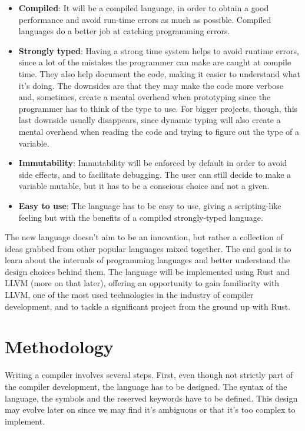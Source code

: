 ﻿\documentclass[10pt,a4paper,twocolumn,twoside]{article}
\begin{document}
\begin{itemize}
     \item \textbf{Compiled}: It will be a compiled language, in order to obtain
         a good performance and avoid run-time errors as much as possible.
         Compiled languages do a better job at catching programming errors.
     \item \textbf{Strongly typed}: Having a strong time system helps to avoid
         runtime errors, since a lot of the mistakes the programmer can make are
         caught at compile time. They also help document the code, making it
         easier to understand what it's doing. The downsides are that they may
         make the code more verbose and, sometimes, create a mental overhead
         when prototyping since the programmer has to think of the type to use.
         For bigger projects, though, this last downside usually disappears,
         since dynamic typing will also create a mental overhead when reading
         the code and trying to figure out the type of a variable.
     \item \textbf{Immutability}: Immutability will be enforced by default in 
         order to avoid side effects, and to facilitate debugging. The user can
         still decide to make a variable mutable, but it has to be a conscious
         choice and not a given.
    \item \textbf{Easy to use}: The language has to be easy to use, giving a 
        scripting-like feeling but with the benefits of a compiled
        strongly-typed language.
\end{itemize}

The new language doesn't aim to be an innovation, but rather a collection of
ideas grabbed from other popular languages mixed together. The end goal is to
learn about the internals of programming languages and better understand the
design choices behind them. The language will be implemented using Rust and LLVM
(more on that later), offering an opportunity to gain familiarity with LLVM, one
of the most used technologies in the industry of compiler development, and to
tackle a significant project from the ground up with Rust.

\section{Methodology}
Writing a compiler involves several steps. First, even though not strictly part
of the compiler development, the language has to be designed. The syntax of the
language, the symbols and the reserved keywords have to be defined. This design
may evolve later on since we may find it's ambiguous or that it's too complex to
implement.
\end{document}
